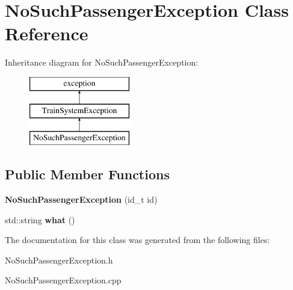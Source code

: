 \hypertarget{classNoSuchPassengerException}{}\section{No\+Such\+Passenger\+Exception Class Reference}
\label{classNoSuchPassengerException}
Inheritance diagram for No\+Such\+Passenger\+Exception\+:\begin{figure}[H]
\begin{center}
\leavevmode
\includegraphics[height=3.000000cm]{classNoSuchPassengerException}
\end{center}
\end{figure}
\subsection*{Public Member Functions}
\begin{DoxyCompactItemize}
\item 
\mbox{\label{classNoSuchPassengerException_a592e57495c93657a25e7da49da5b6649}} 
{\bfseries No\+Such\+Passenger\+Exception} (id\+\_\+t id)
\item 
\mbox{\label{classNoSuchPassengerException_a27bf9b4347fee63ddc405d58d217d82e}} 
std\+::string {\bfseries what} ()
\end{DoxyCompactItemize}


The documentation for this class was generated from the following files\+:\begin{DoxyCompactItemize}
\item 
No\+Such\+Passenger\+Exception.\+h\item 
No\+Such\+Passenger\+Exception.\+cpp\end{DoxyCompactItemize}
